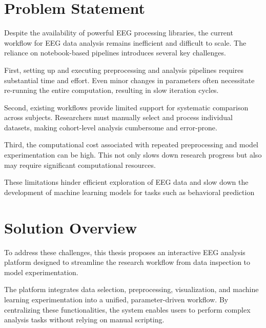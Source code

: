 \section{Problem Statement}
\label{sec:problem-statement}

Despite the availability of powerful EEG processing libraries, the current workflow for EEG data analysis remains inefficient and difficult to scale. The reliance on notebook-based pipelines introduces several key challenges.
\vspace{0.5em}

First, setting up and executing preprocessing and analysis pipelines requires substantial time and effort. Even minor changes in parameters often necessitate re-running the entire computation, resulting in slow iteration cycles.
\vspace{0.5em}

Second, existing workflows provide limited support for systematic comparison across subjects. Researchers must manually select and process individual datasets, making cohort-level analysis cumbersome and error-prone.
\vspace{0.5em}

Third, the computational cost associated with repeated preprocessing and model experimentation can be high. This not only slows down research progress but also may require significant computational resources.
\vspace{0.5em}

These limitations hinder efficient exploration of EEG data and slow down the development of machine learning models for tasks such as behavioral prediction


\section{Solution Overview}
\label{sec:solution-overview}

To address these challenges, this thesis proposes an interactive EEG analysis platform designed to streamline the research workflow from data inspection to model experimentation.
\vspace{0.5em}

The platform integrates data selection, preprocessing, visualization, and machine learning experimentation into a unified, parameter-driven workflow. By centralizing these functionalities, the system enables users to perform complex analysis tasks without relying on manual scripting.
\vspace{0.5em}

